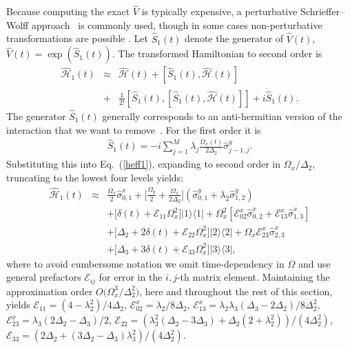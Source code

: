 \documentclass[superscriptaddress,amsmath,amssymb,aps,twocolumn,praplied,notitlepage]{revtex4-2}
\begin{document}
Because computing the exact \(\hat{V}\) is typically expensive, a perturbative Schrieffer–Wolff approach~\cite{PhysRev.149.491} is commonly used, though in some cases non-perturbative transformations are possible \cite{PhysRevA.88.062318,Li2024Experimental, ibanez2012multiple, PhysRev.149.491}.
Let $\hat{S}_{1}(t)$ denote the generator of $\hat{V}(t)$, $\hat{V}(t)= \exp({\hat{S}_{1}(t)})$. The transformed Hamiltonian to second order is 
\begin{eqnarray}\nonumber
\label{heff1}
\hat{\mathcal{H}}_{1}(t) &\approx& \hat{\mathcal{H}}(t) + [\hat{S}_{1}(t),\hat{\mathcal{H}}(t)]\\
&+& \frac{1}{2!}[\hat{S}_{1}(t),[\hat{S}_{1}(t),\hat{\mathcal{H}}(t)]] + i \dot{\hat{S}}_{1}(t).  
\end{eqnarray}
The generator $\hat{S}_{1}(t)$ generally corresponds to an anti-hermitian version of the interaction that we want to remove~\cite{Li2022Nonperturbative}. For the first order it is
\begin{eqnarray}
    \hat{S}_{1}(t) = -i\sum_{j=1}^{M}  \lambda_j \frac{\Omega_x(t)}{2\Delta_2} \hat{\sigma}^y_{j-1, j}.
    \label{eq:frame_DRAG}
\end{eqnarray}
Substituting this into Eq.~(\ref{heff1}), expanding to second order in $\Omega_{x}/\Delta_2$, {truncating to the lowest four levels yields:}
\begin{eqnarray}
\label{FirstH}
 \hat{\mathcal{H}}_{1}(t) &\approx& \frac{\Omega_{x}}{2}  \hat{\sigma}_{0,1}^x+ \bigg[\frac{\Omega_y}{2}+\frac{\dot{\Omega}_x}{2\Delta_2}\bigg] (\hat{\sigma}_{0,1}^y+\lambda_{2}\hat{\sigma}_{1,2}^y) \\ \nonumber
 &&+\big[\delta(t) +\mathcal{E}_{11}\Omega_x^2 \big]|1\rangle\langle 1| +  \Omega_x^2[\mathcal{E}^x_{02}\hat{\sigma}_{0,2}^x +  \mathcal{E}^x_{13}\hat{\sigma}_{1,3}^x] \\  \nonumber
  &&{+\big[\Delta_2 +2\delta(t) +\mathcal{E}_{22}\Omega_x^2 \big]|2\rangle\langle 2| +\Omega_x \mathcal{E}^x_{23}\hat{\sigma}_{2,3}^x}\\  \nonumber
  &&{+\big[\Delta_3 +3\delta(t) +\mathcal{E}_{33}\Omega_x^2 \big]|3\rangle\langle 3|}, 
\end{eqnarray}
where to avoid cumbersome notation we omit time-dependency in $\Omega$ and use general prefactors $\mathcal{E}_{ij}$ for error in the $i,j$-th matrix element. Maintaining the approximation order $O\big(\Omega_x^3/\Delta_2^2\big)$, here and throughout the rest of this section, yields
$\mathcal{E}_{11}=(4-\lambda_{2}^2)/4\Delta_2$, $\mathcal{E}^x_{02}=\lambda_{2}/8\Delta_2$, $\mathcal{E}^x_{13}=\lambda_{2}\lambda_{3}(\Delta_3-2\Delta_2) /8\Delta_2^2$, $\mathcal{E}^x_{23}=\lambda_3(2\Delta_2-\Delta_3)/2$, $\mathcal{E}_{22}=(\lambda_3^2(\Delta_2-3\Delta_3)+\Delta_2(2+\lambda_2^2))/(4\Delta_2^2)$, $\mathcal{E}_{33}=(2\Delta_2+(3\Delta_2-\Delta_3)\lambda_3^2)/(4\Delta_2^2)$.
 
\end{document}

